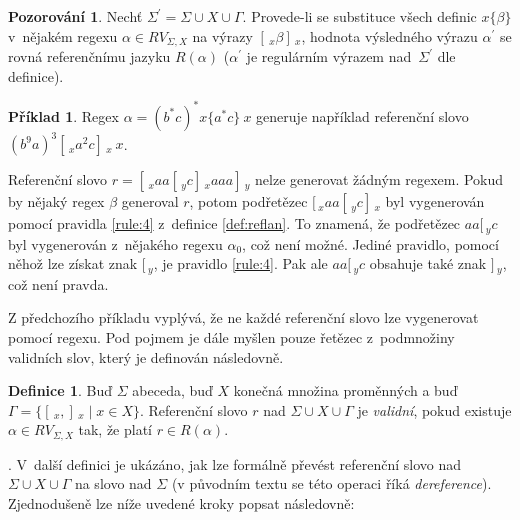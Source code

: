 \documentclass[thesis=B,czech]{FITthesis}[2019/12/23]
\theoremstyle{definition}
\newtheorem{definition}{Definice}[chapter]
\newtheorem{example}{Příklad}[chapter]
\newtheorem{pozorovani}{Pozorování}[chapter]
\begin{document}
\begin{pozorovani}\label{poz:hodnota}
Nechť $\Sigma^\prime = \Sigma \cup X \cup \Gamma$. Provede-li se substituce všech definic $x \{ \beta \}$ v~nějakém regexu $\alpha \in RV_{\Sigma, X}$ na výrazy $[\,_x \beta ]\,_x$, hodnota výsledného výrazu $\alpha^\prime$ se rovná referenčnímu jazyku $R(\alpha)$ ($\alpha^\prime$ je regulárním výrazem nad~$\Sigma^\prime$ dle definice). \cite[s. 4]{fsdeter}
\end{pozorovani}

\begin{example} 
Regex $\alpha = \left( b^\ast c \right)^\ast x \{ a^\ast c \} \ x $ generuje například referenční slovo $\left(b^9a\right)^3 [\,_x a^2 c ]\,_x \ x$.

Referenční slovo $r = [\,_x aa  [\,_y c ]\,_x aaa ]\,_y$ nelze generovat žádným regexem. Pokud by nějaký regex $\beta$ generoval $r$, potom podřetězec  $[\,_x aa  [\,_y c ]\,_x$ byl vygenerován pomocí pravidla \ref{rule:4} z~definice \ref{def:reflan}. To znamená, že podřetězec $aa  [\,_y c$  byl vygenerován z~nějakého regexu $\alpha_0$, což není možné. Jediné pravidlo, pomocí něhož lze získat znak $[\,_y$, je pravidlo \ref{rule:4}. Pak ale $aa  [\,_y c$ obsahuje také znak $]\,_y$, což není pravda.
\end{example}

Z předchozího příkladu vyplývá, že ne každé referenční slovo lze vygenerovat pomocí regexu. Pod pojmem  je dále myšlen pouze řetězec z~podmnožiny validních slov, který je definován následovně.

\begin{definition}
Buď $\Sigma$ abeceda, buď $X$ konečná množina proměnných a buď $\Gamma = \{ [\,_x , ]\,_x \mid x \in X \}$. Referenční slovo $r$ nad $\Sigma \cup X \cup \Gamma$  je \emph{validní}, pokud existuje $\alpha \in RV_{\Sigma, X}$ tak, že platí $r \in R\left(\alpha\right)$.
\end{definition}

. \cite{fsdeter} V~další definici je ukázáno, jak lze formálně převést referenční slovo nad $\Sigma \cup X \cup \Gamma$ na slovo nad $\Sigma$ (v původním textu se této operaci říká \emph{dereference}). Zjednodušeně lze níže uvedené kroky popsat následovně:
   
\end{document}
